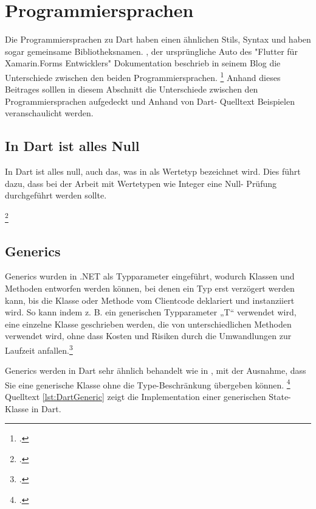 \section{Programmiersprachen}
Die Programmiersprachen \Csharp zu Dart haben einen ähnlichen Stils,  Syntax und haben sogar gemeinsame Bibliotheksnamen.  \citeauthor{Pedley2019}, der ursprüngliche Auto des "Flutter für Xamarin.Forms Entwicklers" Dokumentation beschrieb in seinem Blog die Unterschiede zwischen den beiden Programmiersprachen. \footcite[Vgl. ][Abgerufen am \today]{Pedley2019} Anhand dieses Beitrages solllen in diesem Abschnitt die Unterschiede zwischen den Programmiersprachen aufgedeckt und Anhand von Dart- Quelltext Beispielen veranschaulicht werden.    
\subsection{In Dart ist alles Null}
In Dart ist alles null, auch das, was in \Csharp als Wertetyp bezeichnet wird.  Dies führt dazu,  dass bei der Arbeit mit Wertetypen wie Integer eine Null- Prüfung durchgeführt werden sollte.

\begin{minipage}{\linewidth}

\end{minipage}
\footcitetext[In Anlehnung an ][Abgerufen am \today]{Pedley2019}


\subsection{Generics}
Generics wurden in .NET als Typparameter eingeführt,  wodurch Klassen und Methoden entworfen werden können, bei denen ein Typ erst verzögert werden kann,  bis die Klasse oder Methode vom Clientcode deklariert und instanziiert wird.  So kann indem z. B. ein generischen Typparameter „T“ verwendet wird,  eine einzelne Klasse geschrieben werden, die von unterschiedlichen Methoden verwendet wird, ohne dass Kosten und Risiken durch die Umwandlungen zur Laufzeit anfallen.\footcite[Vgl. ][Abgerufen am \today]{MicrosoftGenerics2015} 

Generics werden in Dart sehr ähnlich behandelt wie in \Csharp ,  mit der Ausnahme,  dass Sie eine generische Klasse ohne die Type-Beschränkung übergeben können.  \footcite[Vgl.][S. 98]{Cheng2019} Quelltext \ref{lst:DartGeneric} zeigt die Implementation einer generischen State-Klasse in Dart. 

